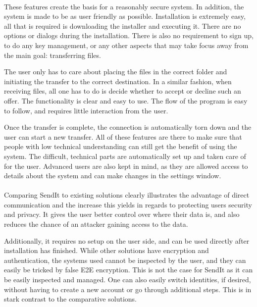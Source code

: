 \paragraph{}
%
These features create the basis for a reasonably secure system. In addition, the system is made to be as user friendly as possible. Installation is extremely easy, all that is required is downloading the installer and executing it. There are no options or dialogs during the installation. There is also no requirement to sign up, to do any key management, or any other aspects that may take focus away from the main goal: transferring files.

The user only has to care about placing the files in the correct folder and initiating the transfer to the correct destination. In a similar fashion, when receiving files, all one has to do is decide whether to accept or decline such an offer. The functionality is clear and easy to use. The flow of the program is easy to follow, and requires little interaction from the user.

Once the transfer is complete, the connection is automatically torn down and the user can start a new transfer. All of these features are there to make sure that people with low technical understanding can still get the benefit of using the system. The difficult, technical parts are automatically set up and taken care of for the user. Advanced users are also kept in mind, as they are allowed access to details about the system and can make changes in the settings window.
%
\paragraph{}
%
Comparing SendIt to existing solutions clearly illustrates the advantage of direct communication and the increase this yields in regards to protecting users security and privacy. It gives the user better control over where their data is, and also reduces the chance of an attacker gaining access to the data.

Additionally, it requires no setup on the user side, and can be used directly after installation has finished. While other solutions have encryption and authentication, the systems used cannot be inspected by the user, and they can easily be tricked by false E2E encryption. This is not the case for SendIt as it can be easily inspected and managed. One can also easily switch identities, if desired, without having to create a new account or go through additional steps. This is in stark contrast to the comparative solutions.
%
